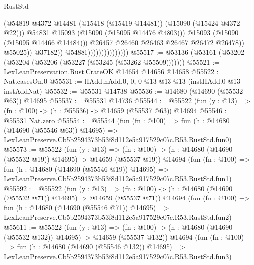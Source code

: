 \begin{lexlean}{RustStd}
\begin{coremodule}
                                                  (@54819
                                                    @4372
                                                    @14481
                                                    (@15418 (@15419 @14481))
                                                    (@15090 (@15424 @4372 @22)))
                                                  @54831
                                                  @15093
                                                  (@15090 (@15095 @14476 @4803)))
                                                @15093
                                                (@15090 (@15095 @14466 @14484)))
                                              @26457
                                              @26460
                                              @26463
                                              @26467
                                              @26472
                                              @26478))
                                          @55025))
                                      @37182))
                                  @54881)))))))))))))))
@55517 := @53136 (@53161 (@53202 (@53204 (@53206 (@53227 (@53245 (@53262 @55509)))))))
@55521 := LexLeanPreservation.Rust.CrateOK @14654 @14656 @14658
@55522 := Nat.casesOn.{0}
@55531 := HAdd.hAdd.{0, 0, 0} @13 @13 @13 (instHAdd.{0} @13 instAddNat)
@55532 := @55531 @14738
@55536 := @14680 (@14690 (@55532 @63)) @14695
@55537 := @55531 @14736
@55544 := @55522 (fun (y : @13) => (fn : @100) -> (h : @55536) -> @14659 (@55537 @63)) @14694
@55546 := @55531 Nat.zero
@55554 := @55544
    (fun (fn : @100) =>
    fun (h : @14680 (@14690 (@55546 @63)) @14695) =>
    LexLeanPreserve.Cb5b2594373b53f8d112e5a917529c07c.R53.RustStd.fun0)
@55573 := @55522
    (fun (y : @13) =>
    (fn : @100) -> (h : @14680 (@14690 (@55532 @19)) @14695) -> @14659 (@55537 @19))
    @14694
    (fun (fn : @100) =>
    fun (h : @14680 (@14690 (@55546 @19)) @14695) =>
    LexLeanPreserve.Cb5b2594373b53f8d112e5a917529c07c.R53.RustStd.fun1)
@55592 := @55522
    (fun (y : @13) =>
    (fn : @100) -> (h : @14680 (@14690 (@55532 @71)) @14695) -> @14659 (@55537 @71))
    @14694
    (fun (fn : @100) =>
    fun (h : @14680 (@14690 (@55546 @71)) @14695) =>
    LexLeanPreserve.Cb5b2594373b53f8d112e5a917529c07c.R53.RustStd.fun2)
@55611 := @55522
    (fun (y : @13) =>
    (fn : @100) -> (h : @14680 (@14690 (@55532 @132)) @14695) -> @14659 (@55537 @132))
    @14694
    (fun (fn : @100) =>
    fun (h : @14680 (@14690 (@55546 @132)) @14695) =>
    LexLeanPreserve.Cb5b2594373b53f8d112e5a917529c07c.R53.RustStd.fun3)

\end{coremodule}
\end{lexlean}
